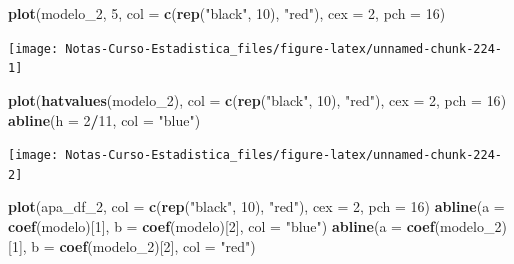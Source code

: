 \documentclass[
  12pt,
]{book}
\newenvironment{Shaded}{\begin{snugshade}}{\end{snugshade}}
\newcommand{\DataTypeTok}[1]{\textcolor[rgb]{0.13,0.29,0.53}{#1}}
\newcommand{\DecValTok}[1]{\textcolor[rgb]{0.00,0.00,0.81}{#1}}
\newcommand{\KeywordTok}[1]{\textcolor[rgb]{0.13,0.29,0.53}{\textbf{#1}}}
\newcommand{\NormalTok}[1]{#1}
\newcommand{\OperatorTok}[1]{\textcolor[rgb]{0.81,0.36,0.00}{\textbf{#1}}}
\newcommand{\StringTok}[1]{\textcolor[rgb]{0.31,0.60,0.02}{#1}}
\theoremstyle{definition}
\theoremstyle{definition}
\theoremstyle{definition}
\theoremstyle{remark}
\begin{document}
\begin{Shaded}
\begin{Highlighting}[]
\KeywordTok{plot}\NormalTok{(modelo_}\DecValTok{2}\NormalTok{, }\DecValTok{5}\NormalTok{, }\DataTypeTok{col =} \KeywordTok{c}\NormalTok{(}\KeywordTok{rep}\NormalTok{(}\StringTok{"black"}\NormalTok{, }\DecValTok{10}\NormalTok{), }\StringTok{"red"}\NormalTok{), }
    \DataTypeTok{cex =} \DecValTok{2}\NormalTok{, }\DataTypeTok{pch =} \DecValTok{16}\NormalTok{)}
\end{Highlighting}
\end{Shaded}

\begin{center}\texttt{[image: Notas-Curso-Estadistica\_files/figure-latex/unnamed-chunk-224-1]} \end{center}

\begin{Shaded}
\begin{Highlighting}[]
\KeywordTok{plot}\NormalTok{(}\KeywordTok{hatvalues}\NormalTok{(modelo_}\DecValTok{2}\NormalTok{), }\DataTypeTok{col =} \KeywordTok{c}\NormalTok{(}\KeywordTok{rep}\NormalTok{(}\StringTok{"black"}\NormalTok{, }\DecValTok{10}\NormalTok{), }
    \StringTok{"red"}\NormalTok{), }\DataTypeTok{cex =} \DecValTok{2}\NormalTok{, }\DataTypeTok{pch =} \DecValTok{16}\NormalTok{)}
\KeywordTok{abline}\NormalTok{(}\DataTypeTok{h =} \DecValTok{2}\OperatorTok{/}\DecValTok{11}\NormalTok{, }\DataTypeTok{col =} \StringTok{"blue"}\NormalTok{)}
\end{Highlighting}
\end{Shaded}

\begin{center}\texttt{[image: Notas-Curso-Estadistica\_files/figure-latex/unnamed-chunk-224-2]} \end{center}

\begin{Shaded}
\begin{Highlighting}[]
\KeywordTok{plot}\NormalTok{(apa_df_}\DecValTok{2}\NormalTok{, }\DataTypeTok{col =} \KeywordTok{c}\NormalTok{(}\KeywordTok{rep}\NormalTok{(}\StringTok{"black"}\NormalTok{, }\DecValTok{10}\NormalTok{), }\StringTok{"red"}\NormalTok{), }\DataTypeTok{cex =} \DecValTok{2}\NormalTok{, }
    \DataTypeTok{pch =} \DecValTok{16}\NormalTok{)}
\KeywordTok{abline}\NormalTok{(}\DataTypeTok{a =} \KeywordTok{coef}\NormalTok{(modelo)[}\DecValTok{1}\NormalTok{], }\DataTypeTok{b =} \KeywordTok{coef}\NormalTok{(modelo)[}\DecValTok{2}\NormalTok{], }\DataTypeTok{col =} \StringTok{"blue"}\NormalTok{)}
\KeywordTok{abline}\NormalTok{(}\DataTypeTok{a =} \KeywordTok{coef}\NormalTok{(modelo_}\DecValTok{2}\NormalTok{)[}\DecValTok{1}\NormalTok{], }\DataTypeTok{b =} \KeywordTok{coef}\NormalTok{(modelo_}\DecValTok{2}\NormalTok{)[}\DecValTok{2}\NormalTok{], }
    \DataTypeTok{col =} \StringTok{"red"}\NormalTok{)}
\end{Highlighting}
\end{Shaded}
\end{document}
